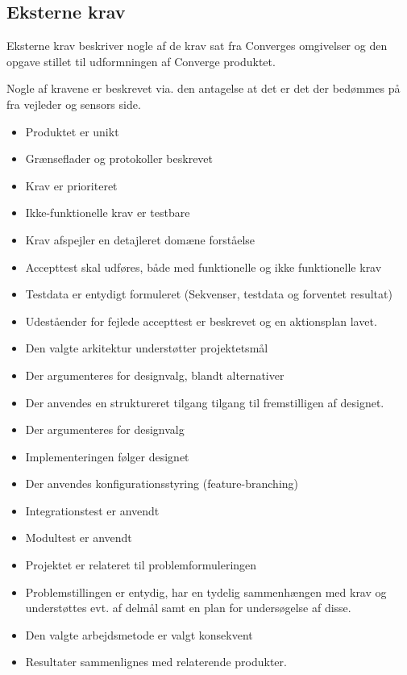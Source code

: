 \subsection{Eksterne krav}

Eksterne krav beskriver nogle af de krav sat fra Converges omgivelser og den opgave stillet til udformningen af Converge produktet.

Nogle af kravene er beskrevet via. den antagelse at det er det der bedømmes på fra vejleder og sensors side.

\begin{itemize}
  \item Produktet er unikt
  \item Grænseflader og protokoller beskrevet
  \item Krav er prioriteret
  \item Ikke-funktionelle krav er testbare
  \item Krav afspejler en detajleret domæne forståelse
  \item Accepttest skal udføres, både med funktionelle og ikke funktionelle krav
  \item Testdata er entydigt formuleret (Sekvenser, testdata og forventet resultat)
  \item Udeståender for fejlede accepttest er beskrevet og en aktionsplan lavet.
  \item Den valgte arkitektur understøtter projektetsmål
  \item Der argumenteres for designvalg, blandt alternativer
  \item Der anvendes en struktureret tilgang tilgang til fremstilligen af designet.
  \item Der argumenteres for designvalg
  \item Implementeringen følger designet
  \item Der anvendes konfigurationsstyring (feature-branching)
  \item Integrationstest er anvendt
  \item Modultest er anvendt
  \item Projektet er relateret til problemformuleringen
  \item Problemstillingen er entydig, har en tydelig sammenhængen med krav og understøttes evt. af delmål samt en plan for undersøgelse af disse.
  \item Den valgte arbejdsmetode er valgt konsekvent
  \item Resultater sammenlignes med relaterende produkter.
\end{itemize}